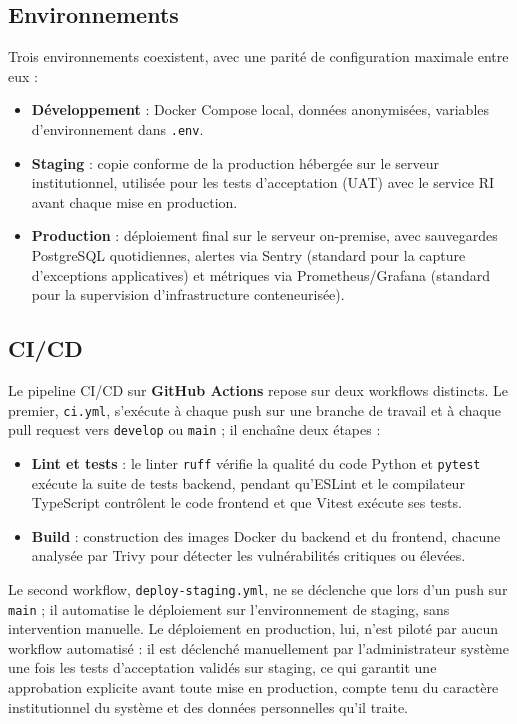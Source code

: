 \subsection{Environnements}

Trois environnements coexistent, avec une parité de configuration maximale entre eux :

\begin{itemize}
  \item \textbf{Développement} : Docker Compose local, données anonymisées, variables d'environnement dans \texttt{.env}. 
  \item \textbf{Staging} : copie conforme de la production hébergée sur le serveur institutionnel, utilisée pour les tests d'acceptation (UAT) avec le service RI avant chaque mise en production.
  \item \textbf{Production} : déploiement final sur le serveur on-premise, avec sauvegardes PostgreSQL quotidiennes, alertes via Sentry (standard pour la capture d'exceptions applicatives) et métriques via Prometheus/Grafana (standard pour la supervision d'infrastructure conteneurisée).
\end{itemize}

\subsection{CI/CD}

Le pipeline CI/CD sur \textbf{GitHub Actions} repose sur deux workflows distincts. Le premier, \texttt{ci.yml}, s'exécute à chaque push sur une branche de travail et à chaque pull request vers \texttt{develop} ou \texttt{main} ; il enchaîne deux étapes :

\begin{itemize}
  \item \textbf{Lint et tests} : le linter \texttt{ruff} vérifie la qualité du code Python et \texttt{pytest} exécute la suite de tests backend, pendant qu'ESLint et le compilateur TypeScript contrôlent le code frontend et que Vitest exécute ses tests.
  \item \textbf{Build} : construction des images Docker du backend et du frontend, chacune analysée par Trivy pour détecter les vulnérabilités critiques ou élevées.
\end{itemize}

Le second workflow, \texttt{deploy-staging.yml}, ne se déclenche que lors d'un push sur \texttt{main} ; il automatise le déploiement sur l'environnement de staging, sans intervention manuelle. Le déploiement en production, lui, n'est piloté par aucun workflow automatisé : il est déclenché manuellement par l'administrateur système une fois les tests d'acceptation validés sur staging, ce qui garantit une approbation explicite avant toute mise en production, compte tenu du caractère institutionnel du système et des données personnelles qu'il traite.

